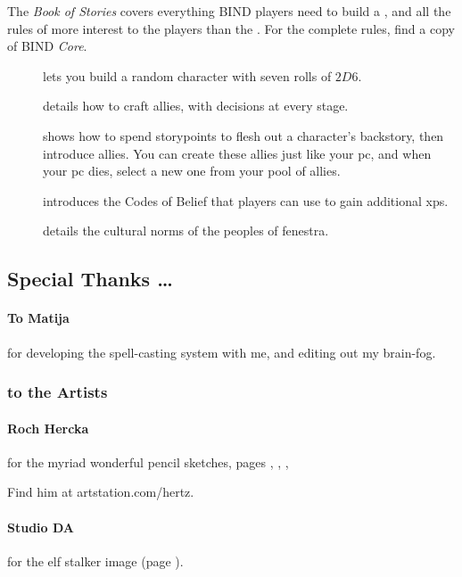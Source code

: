\begin{multicols}{2}
The \textit{Book of Stories} covers everything BIND players need to build a , and all the rules of more interest to the players than the .
For the complete rules, find a copy of BIND \textit{Core}.

\begin{description}
  \item[]
  lets you build a random character with seven rolls of $2D6$.
  \item[]
  details how to craft allies, with decisions at every stage.
  \item[] shows how to spend \glspl{storypoint} to flesh out a character's backstory, then introduce allies.
  You can create these allies just like your \gls{pc}, and when your \gls{pc} dies, select a new one from your pool of allies.
  \item[] introduces the Codes of Belief that players can use to gain additional \glspl{xp}.
  \item[] details the cultural norms of the peoples of \gls{fenestra}.
\end{description}

\subsection*{Special Thanks \ldots}

\paragraph{To Matija}
for developing the spell-casting system with me, and editing out my brain-fog.

\subsubsection*{to the Artists}

\paragraph{Roch Hercka} for the myriad wonderful pencil sketches, pages 
\pageref{Roch_Hercka/five_races}, 
\pageref{Roch_Hercka/xp-1}, 
\pageref{Roch_Hercka/xp-2}, 

Find him at artstation.com/hertz.

\paragraph{Studio DA}
for the elf stalker image
(page \pageref{Studio_DA/elf_stalker}).


\end{multicols}
